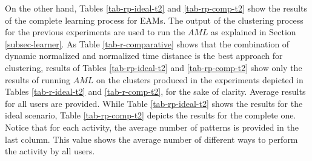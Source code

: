 On the other hand, Tables \ref{tab-rp-ideal-t2} and \ref{tab-rp-comp-t2} show the results of the complete learning process for EAMs. The output of the clustering process for the previous experiments are used to run the $AML$ as explained in Section \ref{subsec-learner}. As Table \ref{tab-r-comparative} shows that the combination of dynamic normalized and normalized time distance is the best approach for clustering, results of Tables \ref{tab-rp-ideal-t2} and \ref{tab-rp-comp-t2} show only the results of running $AML$ on the clusters produced in the experiments depicted in Tables \ref{tab-r-ideal-t2} and \ref{tab-r-comp-t2}, for the sake of clarity. Average results for all users are provided. While Table \ref{tab-rp-ideal-t2} shows the results for the ideal scenario, Table \ref{tab-rp-comp-t2} depicts the results for the complete one. Notice that for each activity, the average number of patterns is provided in the last column. This value shows the average number of different ways to perform the activity by all users.


